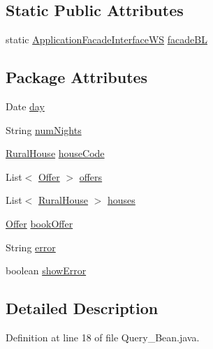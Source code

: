 \subsection*{Static Public Attributes}
\begin{DoxyCompactItemize}
\item 
static \mbox{\hyperlink{interfacebusinessLogic_1_1ApplicationFacadeInterfaceWS}{Application\+Facade\+Interface\+WS}} \mbox{\hyperlink{classbean_1_1Query__Bean_a8809176658727a8daec87ba0b2dda2de}{facade\+BL}}
\end{DoxyCompactItemize}
\subsection*{Package Attributes}
\begin{DoxyCompactItemize}
\item 
Date \mbox{\hyperlink{classbean_1_1Query__Bean_a84d256eca7a4f868d77e549b82d87ddf}{day}}
\item 
String \mbox{\hyperlink{classbean_1_1Query__Bean_a76fd38e1297497efc591fc46a6ae64f4}{num\+Nights}}
\item 
\mbox{\hyperlink{classdomain_1_1RuralHouse}{Rural\+House}} \mbox{\hyperlink{classbean_1_1Query__Bean_af1040de2275895452b9e60535b4983b6}{house\+Code}}
\item 
List$<$ \mbox{\hyperlink{classdomain_1_1Offer}{Offer}} $>$ \mbox{\hyperlink{classbean_1_1Query__Bean_ab994c486fce1a6f2f3fa9a7b333187ba}{offers}}
\item 
List$<$ \mbox{\hyperlink{classdomain_1_1RuralHouse}{Rural\+House}} $>$ \mbox{\hyperlink{classbean_1_1Query__Bean_a8c158c927390375bed7935b2db5e4f53}{houses}}
\item 
\mbox{\hyperlink{classdomain_1_1Offer}{Offer}} \mbox{\hyperlink{classbean_1_1Query__Bean_ab3019b29aceba9be1d718c06f02efbf0}{book\+Offer}}
\item 
String \mbox{\hyperlink{classbean_1_1Query__Bean_a41a8d631f015a0b8df5a9b40f5cc3231}{error}}
\item 
boolean \mbox{\hyperlink{classbean_1_1Query__Bean_a7334f280df18d4e790c5a086b8334a0f}{show\+Error}}
\end{DoxyCompactItemize}


\subsection{Detailed Description}


Definition at line 18 of file Query\+\_\+\+Bean.\+java.



